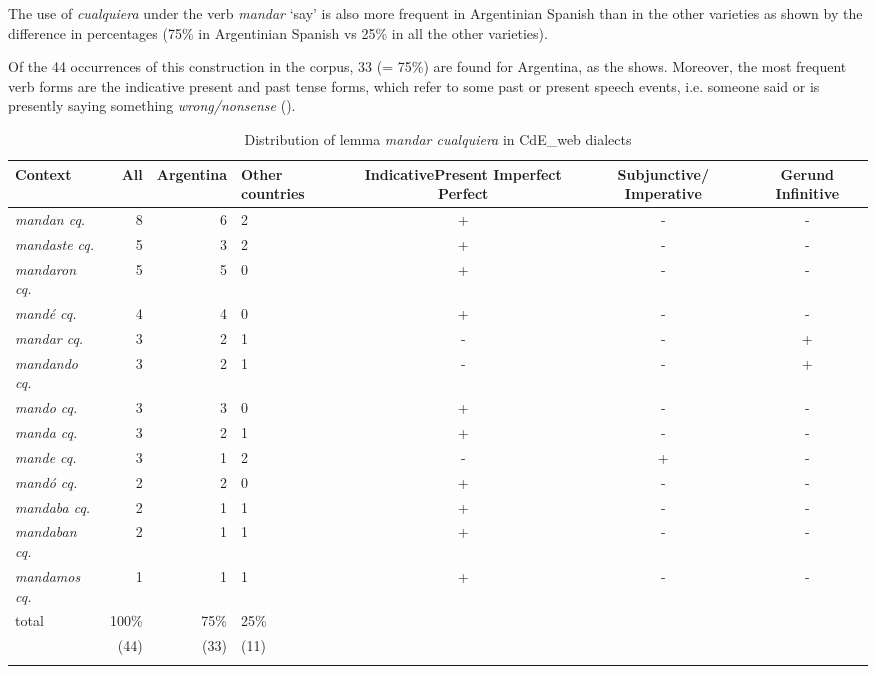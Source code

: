 The use of \textit{cualquiera} under the verb \textit{mandar} ‘say’ is also more frequent in Argentinian Spanish than in the other varieties as shown by the difference in percentages (75\% in Argentinian Spanish vs 25\% in all the other varieties).

Of the 44 occurrences of this construction in the corpus, 33 (= 75\%) are found for Argentina, as the  shows. Moreover, the most frequent verb forms are the indicative present and past tense forms, which refer to some past or present speech events, i.e. someone said or is presently saying something \textit{wrong/nonsense} ().

\begin{table}
\small
\begin{tabularx}{\textwidth}{l@{~~}r@{~~}r@{}YCCC@{}}
\lsptoprule
 {Context} & {All} & {Argentina} & {Other} {countries} & { {Indicative}}{ {Present}} { \mbox{Imperfect}}  {Perfect} & { {Subjunctive/}} \mbox{Imperative} & { {Gerund}} { {Infinitive}}\\
 \midrule
 \textit{mandan   cq.} & 8 & 6 & 2 & + & - & -\\
 \textit{mandaste cq.} & 5 & 3 & 2 & + & - & -\\
 \textit{mandaron cq.} & 5 & 5 & 0 & + & - & -\\
 \textit{mandé    cq.} & 4 & 4 & 0 & + & - & -\\
 \textit{mandar   cq.} & 3 & 2 & 1 & - & - & +\\
 \textit{mandando cq.} & 3 & 2 & 1 & - & - & +\\
 \textit{mando    cq.} & 3 & 3 & 0 & + & - & -\\
 \textit{manda    cq.} & 3 & 2 & 1 & + & - & -\\
 \textit{mande    cq.} & 3 & 1 & 2 & - & + & -\\
 \textit{mandó    cq.} & 2 & 2 & 0 & + & - & -\\
 \textit{mandaba  cq.} & 2 & 1 & 1 & + & - & -\\
 \textit{mandaban cq.} & 2 & 1 & 1 & + & - & -\\
 \textit{mandamos cq.} & 1 & 1 & 1 & + & - & -\\
\midrule
  {total} & { 100\%}   & { 75\%}   & { 25\%}  &  &  & \\
                &   (44) &   (33) &  (11) &  &  & \\
\lspbottomrule
\end{tabularx}
\caption{\label{tab:key:10} Distribution of lemma \textit{mandar cualquiera} in CdE\_web dialects} %
\end{table}

